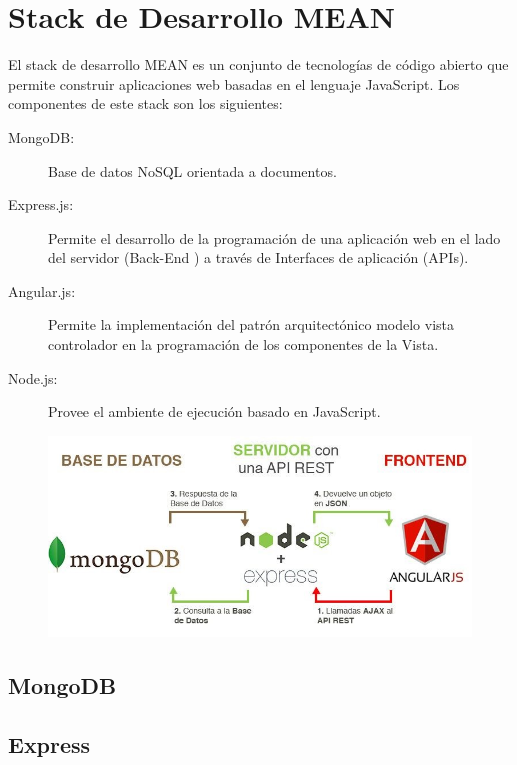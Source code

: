 \documentclass[10pt,a4paper]{report}
\begin{document}
\section{Stack de Desarrollo MEAN}

El stack de desarrollo MEAN es un conjunto de tecnologías de código abierto que permite construir aplicaciones web basadas en el lenguaje JavaScript. Los componentes de este stack son los siguientes:

\begin{description}
	\item[MongoDB:] Base de datos NoSQL orientada a documentos.
	
	\item[Express.js:] Permite el desarrollo de la programación de una aplicación web en el lado del servidor (Back-End ) a través de Interfaces de aplicación (APIs).
	
	\item[Angular.js:] Permite la implementación del patrón arquitectónico modelo vista controlador en la programación de los componentes de la Vista.
	
	\item[Node.js:] Provee el ambiente de ejecución basado en JavaScript.
	
\end{description}

\begin{figure}[h!]
	\centering
	\includegraphics[width=1\textwidth]{images/stack-mean}
\end{figure}

\FloatBarrier
\subsection{MongoDB}

\subsection{Express}
\end{document}
